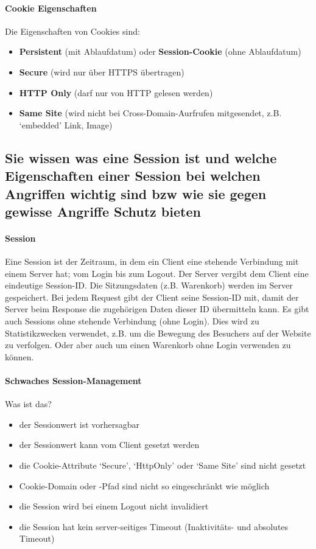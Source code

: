 \documentclass[10pt,a4paper]{article}
\begin{document}
\paragraph*{Cookie Eigenschaften}Die Eigenschaften von Cookies sind:
\begin{itemize}[noitemsep,topsep=0pt,leftmargin=*]
    \item \textbf{Persistent} (mit Ablaufdatum) oder \textbf{Session-Cookie} (ohne Ablaufdatum)
    \item \textbf{Secure} (wird nur über HTTPS übertragen)
    \item \textbf{HTTP Only} (darf nur von HTTP gelesen werden)
    \item \textbf{Same Site} (wird nicht bei Cross-Domain-Aurfrufen mitgesendet, z.B. `embedded' Link, Image)
\end{itemize}


\subsection*{Sie wissen was eine Session ist und welche Eigenschaften einer Session bei welchen Angriffen wichtig sind bzw wie sie gegen gewisse Angriffe Schutz bieten}

\paragraph*{Session}Eine Session ist der Zeitraum, in dem ein Client eine stehende Verbindung mit einem Server hat; vom Login bis zum Logout. Der Server vergibt dem Client eine eindeutige Session-ID. Die Sitzungsdaten (z.B. Warenkorb) werden im Server gespeichert. Bei jedem Request gibt der Client seine Session-ID mit, damit der Server beim Response die zugehörigen Daten dieser ID übermitteln kann. Es gibt auch Sessions ohne stehende Verbindung (ohne Login). Dies wird zu Statistikzwecken verwendet, z.B. um die Bewegung des Besuchers auf der Website zu verfolgen. Oder aber auch um einen Warenkorb ohne Login verwenden zu können.

\paragraph*{Schwaches Session-Management}Was ist das?
\begin{itemize}[noitemsep,topsep=0pt,leftmargin=*]
    \item der Sessionwert ist vorhersagbar
    \item der Sessionwert kann vom Client gesetzt werden
    \item die Cookie-Attribute `Secure', `HttpOnly' oder `Same Site' sind nicht gesetzt
    \item Cookie-Domain oder -Pfad sind nicht so eingeschränkt wie möglich
    \item die Session wird bei einem Logout nicht invalidiert
    \item die Session hat kein server-seitiges Timeout (Inaktivitäts- und absolutes Timeout)
\end{itemize}
\end{document}
